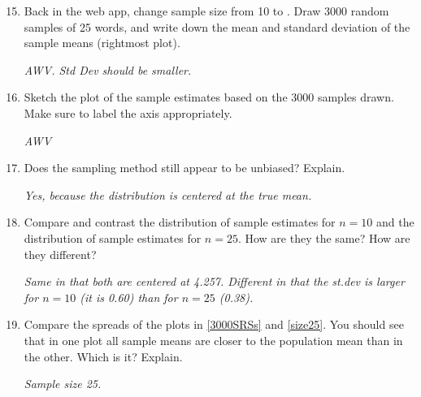      \begin{enumerate}
       \setcounter{enumi}{14}
     \item Back in the web app, change sample size from 10 to . 
       Draw 3000 random samples of 25 words, and write down
       the mean and standard deviation of the sample means (rightmost plot).
\begin{students}
  \vspace{1cm}
\end{students}    
\begin{key}
   {\it  AWV. Std Dev should be smaller.}
\end{key}

     \item \label{size25} Sketch the plot of the sample estimates based on the
       3000 samples drawn. Make sure to label the axis appropriately. 
       \begin{students}
  \vspace{4cm}
\end{students}    
\begin{key}
   {\it  AWV}
\end{key}

     \item  Does the sampling method still appear to be unbiased? Explain.
       \begin{students}
  \vspace{1cm}
\end{students}    
\begin{key}
   {\it  Yes, because the distribution is centered at the true mean.}
\end{key}

     \item  Compare and contrast the distribution of sample estimates
       for $n = 10$ and the distribution of sample estimates for $n =
       25$. How are they the same? How are they different?  
       \begin{students}
  \vspace{2cm}
\end{students}    
\begin{key}
   {\it  Same in that both are centered at 4.257.  Different in that
     the st.dev is larger for $n=10$ (it is 0.60) than for $n = 25$
     (0.38). }
\end{key}

     \item Compare the spreads of the plots in \ref{3000SRSs} and
       \ref{size25}.   You should see that in one plot all sample
       means are closer to the population mean than in the other.
       Which is it? Explain.
\begin{students}
  \vspace{1cm}
\end{students}    
\begin{key}
   {\it  Sample size 25.}
\end{key}


\end{enumerate}
